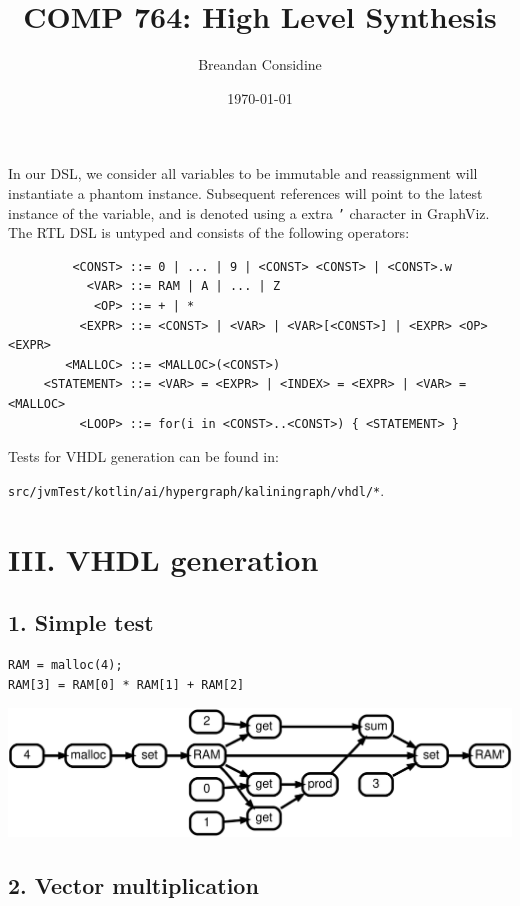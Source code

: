 \documentclass[11pt]{article}
\title{COMP 764: High Level Synthesis}
\date{\today}
\author{Breandan Considine}
\begin{document}
    \maketitle

In our DSL, we consider all variables to be immutable and reassignment will instantiate a phantom instance. Subsequent references will point to the latest instance of the variable, and is denoted using a extra \texttt{'} character in GraphViz. The RTL DSL is untyped and consists of the following operators:

\begin{lstlisting}
         <CONST> ::= 0 | ... | 9 | <CONST> <CONST> | <CONST>.w
           <VAR> ::= RAM | A | ... | Z
            <OP> ::= + | *
          <EXPR> ::= <CONST> | <VAR> | <VAR>[<CONST>] | <EXPR> <OP> <EXPR>
        <MALLOC> ::= <MALLOC>(<CONST>)
     <STATEMENT> ::= <VAR> = <EXPR> | <INDEX> = <EXPR> | <VAR> = <MALLOC>
          <LOOP> ::= for(i in <CONST>..<CONST>) { <STATEMENT> }
\end{lstlisting}

Tests for VHDL generation can be found in:
    
    \texttt{src/jvmTest/kotlin/ai/hypergraph/kaliningraph/vhdl/*}.

\section*{III. VHDL generation}
\subsection*{1. Simple test}

\begin{lstlisting}
RAM = malloc(4);
RAM[3] = RAM[0] * RAM[1] + RAM[2]
\end{lstlisting}

\includegraphics[scale=0.25]{rtd31}

\pagebreak\subsection*{2. Vector multiplication}
\end{document}
